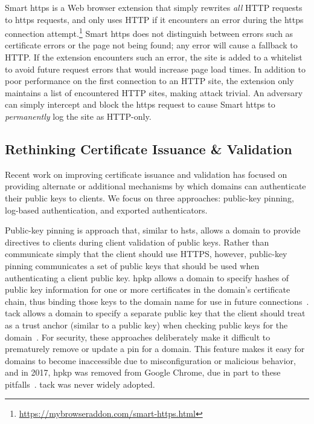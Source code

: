 Smart \ac{https} is a Web browser extension that simply rewrites \emph{all} HTTP
requests to \ac{https} requests, and only uses HTTP if it encounters an error
during the \ac{https} connection
attempt.\footnote{\url{https://mybrowseraddon.com/smart-https.html}} Smart
\ac{https} does not distinguish between errors such as certificate errors or the
page not being found; any error will cause a fallback to HTTP. If the extension
encounters such an error, the site is added to a whitelist to avoid future
request errors that would increase page load times. In addition
to poor performance on the first connection to an HTTP site, the extension only
maintains a list of encountered HTTP sites, making  attack trivial. An
adversary can simply intercept and block the \ac{https} request to cause Smart
\ac{https} to \emph{permanently} log the site as HTTP-only.

\subsection{Rethinking Certificate Issuance \& Validation}

Recent work on improving certificate issuance and validation has focused on
providing alternate or additional mechanisms by which domains can authenticate
their public keys to clients. We focus on three approaches: public-key pinning,
log-based authentication, and exported authenticators.

Public-key pinning is  approach that, similar to \ac{hsts}, allows a
domain to provide directives to clients during client validation of public keys.
Rather than communicate simply that the client should use HTTPS, however,
public-key pinning communicates a set of public keys that should be used when
authenticating a client public key. \ac{hpkp} allows a domain to specify hashes
of public key information for one or more certificates in the domain's
certificate chain, thus binding those keys to the domain name for use in future
connections~\cite{rfc7469}. \ac{tack} allows a domain to specify a separate
public key that the client should treat as a trust anchor (similar to a  public key) 
when checking public keys for the domain~\cite{marlinspike2013trust}. For security,
these approaches deliberately make it difficult to prematurely remove or update
a pin for a domain. This feature makes it easy for domains to become
inaccessible due to misconfiguration or malicious behavior, and in 2017,
\ac{hpkp} was removed from Google Chrome, due in part to these
pitfalls~\cite{palmer2017intent}. \ac{tack} was never widely adopted.

